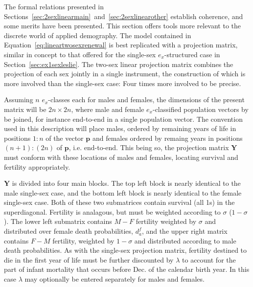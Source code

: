 
The formal relations presented in
Sections~\ref{sec:2sexlinearmain}~and~\ref{sec:2sexlinearother} establish
coherence, and some merits have been presented. This section offers tools
more relevant to the discrete world of applied demography. The model contained
in Equation~\ref{eq:lineartwosexrenewal} is best replicated with a projection
matrix, similar in concept to that offered for the single-sex $e_x$-structured
case in Section~\ref{sec:ex1sexleslie}. The two-sex linear projection matrix combines
the projection of each sex jointly in a single instrument, the construction of 
which is more involved than the single-sex case: Four times more involved to be precise. 

Assuming $n$ $e_x$-classes each for males and females, the dimensions of the
present matrix will be $2n \times 2n$, where male and female
$e_x$-classified population vectors by be joined, for instance end-to-end in a
single population vector. The convention used in this description will place
males, ordered by remaining years of life in positions $1:n$ of the vector
$\textbf{p}$ and females ordered by remaing years in positions $(n+1):(2n)$ of
$\textbf{p}$, i.e. end-to-end. This being so, the projection matrix $\textbf{Y}$
must conform with these locations of males and females, locating survival and 
fertility appropriately.

$\textbf{Y}$ is divided into four main blocks. The top left block is
nearly identical to the male single-sex case, and the bottom left block is
nearly identical to the female single-sex case. Both of these two submatrices
contain survival (all 1s) in the superdiagonal. Fertility is analagous, but must
be weighted according to $\sigma$ ($1-\sigma$). The lower left submatrix
contains $M-F$ fertility weighted by $\sigma$ and distributed over female death probabilities,
$d_a^f$, and the upper right matrix contains $F-M$ fertility, weighted by
$1-\sigma$ and distributed according to male death probabilities. As with the
single-sex projection matrix, fertility destined to die in the first year of
life must be further discounted by $\lambda$ to account for the part of infant
mortality that occurs before Dec.  of the calendar birth year. In this
case $\lambda$ may optionally be entered separately for males and females.

